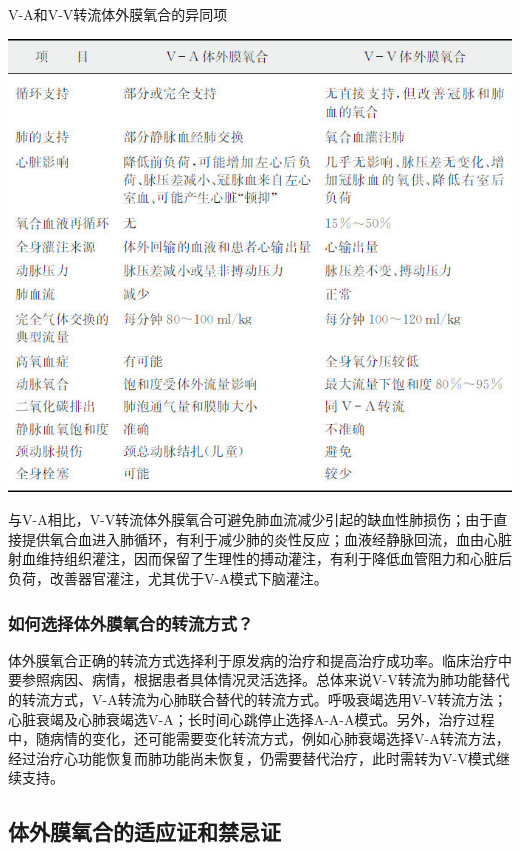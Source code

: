 \begin{table}[htbp]
\centering
\caption{V-A和V-V转流体外膜氧合的异同项}
\label{tab24-2}
\includegraphics{./images/Image00283.jpg}
\end{table}

与V-A相比，V-V转流体外膜氧合可避免肺血流减少引起的缺血性肺损伤；由于直接提供氧合血进入肺循环，有利于减少肺的炎性反应；血液经静脉回流，血由心脏射血维持组织灌注，因而保留了生理性的搏动灌注，有利于降低血管阻力和心脏后负荷，改善器官灌注，尤其优于V-A模式下脑灌注。

\subsubsection{如何选择体外膜氧合的转流方式？}

体外膜氧合正确的转流方式选择利于原发病的治疗和提高治疗成功率。临床治疗中要参照病因、病情，根据患者具体情况灵活选择。总体来说V-V转流为肺功能替代的转流方式，V-A转流为心肺联合替代的转流方式。呼吸衰竭选用V-V转流方法；心脏衰竭及心肺衰竭选V-A；长时间心跳停止选择A-A-A模式。另外，治疗过程中，随病情的变化，还可能需要变化转流方式，例如心肺衰竭选择V-A转流方法，经过治疗心功能恢复而肺功能尚未恢复，仍需要替代治疗，此时需转为V-V模式继续支持。

\subsection{体外膜氧合的适应证和禁忌证}

